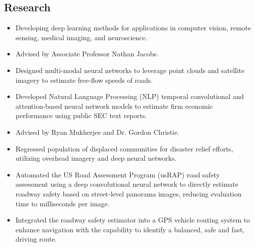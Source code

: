 \documentclass[11pt,a4paper,sans]{moderncv} %
\begin{document}
\subsection{Research}
{
\begin{itemize} 
	\item Developing deep learning methods for applications in computer vision, remote sensing, medical imaging, and neuroscience.
\end{itemize}
}
{
\begin{itemize} 
	\item Advised by Associate Professor Nathan Jacobs.
	\item Designed multi-modal neural networks to leverage point clouds and satellite imagery to estimate free-flow speeds of roads.
	\item Developed Natural Language Processing (NLP) temporal convolutional and attention-based neural network models to estimate firm economic performance using public SEC text reports. 
\end{itemize}
}
{
\begin{itemize} 
	\item Advised by Ryan Mukherjee and Dr. Gordon Christie.
	\item Regressed population of displaced communities for disaster relief efforts, utilizing overhead imagery and deep neural networks.
\end{itemize}
}
{
\begin{itemize} 
	\item Automated the US Road Assessment Program (usRAP) road safety assessment using a deep convolutional neural network to directly estimate roadway safety based on street-level panorama images, reducing evaluation time to milliseconds per image.
	\item Integrated the roadway safety estimator into a GPS vehicle routing system to enhance navigation with the capability to identify a balanced, safe and fast, driving route.
\end{itemize}
}

\end{document}

